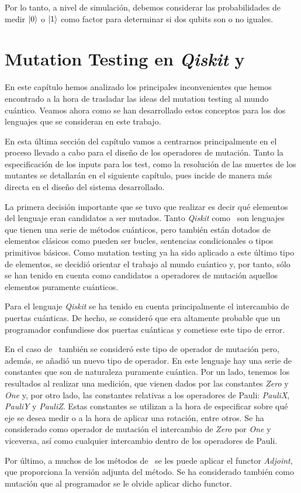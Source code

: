 Por lo tanto, a nivel de simulación, debemos considerar las probabilidades de medir $\left|0\right\rangle$ o $\left|1\right\rangle$ como factor para determinar si dos qubits son o no iguales.


\section{Mutation Testing en \textit{Qiskit} y \qsh}

En este capítulo hemos analizado  los principales inconvenientes que hemos encontrado a la hora de trasladar las ideas del mutation testing al mundo cuántico. Veamos ahora como se han desarrollado estos conceptos para los dos lenguajes que se consideran en este trabajo.

En esta última sección del capítulo vamos a centrarnos principalmente en el proceso llevado a cabo para el diseño de los operadores de mutación. Tanto la especificación de los inputs para los test, como la resolución de las muertes de los mutantes se detallarán en el siguiente capítulo, pues incide de manera más directa en el diseño del sistema desarrollado.

La primera decisión importante que se tuvo que realizar es decir qué elementos del lenguaje  eran candidatos a ser mutados. Tanto \textit{Qiskit} como \qsh\ son lenguajes que tienen una serie de métodos cuánticos, pero también están dotados de elementos clásicos como pueden ser bucles, sentencias condicionales o tipos primitivos básicos. Como mutation testing ya ha sido aplicado a este último tipo de elementos, se decidió orientar el trabajo al mundo cuántico y, por tanto, sólo se han tenido en cuenta como candidatos a operadores de mutación aquellos elementos puramente cuánticos.

Para el lenguaje \textit{Qiskit} se ha tenido en cuenta principalmente el intercambio de puertas cuánticas. De hecho, se consideró que era altamente probable que un programador confundiese dos puertas cuánticas y cometiese este tipo de error.

En el caso de \qsh\ también se consideró este tipo de operador de mutación pero, además, se añadió un nuevo tipo de operador. En este lenguaje hay una serie de constantes que son de naturaleza puramente cuántica. Por un lado, tenemos los resultados al realizar una medición, que vienen dados por las constantes \textit{Zero} y \textit{One} y, por otro lado, las constantes relativas a los operadores de Pauli: \textit{PauliX}, \textit{PauliY} y \textit{PauliZ}. Estas constantes se utilizan a la hora de especificar sobre qué eje se desea medir o a la hora de aplicar una rotación, entre otros. Se ha considerado como operador de mutación el intercambio de \textit{Zero} por \textit{One} y viceversa, así como cualquier intercambio dentro de los operadores de Pauli.

Por último, a muchos de los métodos de \qsh\ se les puede aplicar el functor \textit{Adjoint}, que proporciona la versión adjunta del método. Se ha considerado también como mutación que al programador se le olvide aplicar dicho functor.